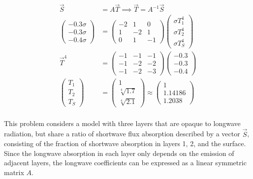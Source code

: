 \documentclass[12pt]{article}
\begin{document}
\begin{equation}\label{lw_inv}
    \begin{split}
        \vec{S}
            &= A\vec{T} \implies  \vec{T} = A^{-1} \vec{S} \\
        \begin{pmatrix}-0.3\sigma \\ -0.3\sigma \\ -0.4\sigma\end{pmatrix}
            &= \begin{pmatrix} -2 & 1 & 0 \\ 1 & -2 & 1 \\ 0 & 1 & -1 \end{pmatrix}
                \begin{pmatrix} \sigma T_1^4 \\ \sigma T_2^4 \\ \sigma T_S^4 \end{pmatrix} \\
        \vec{T}^4
            &= \begin{pmatrix} -1 & -1 & -1 \\ -1 & -2 & -2 \\ -1 & -2 & -3 \end{pmatrix} \begin{pmatrix}-0.3 \\ -0.3 \\ -0.4\end{pmatrix} \\
        \begin{pmatrix} T_1 \\ T_2 \\ T_S \end{pmatrix}
            &= \begin{pmatrix} 1 \\ \sqrt[4]{1.7} \\ \sqrt[4]{2.1} \end{pmatrix} \approx \begin{pmatrix} 1 \\ 1.14186 \\ 1.2038 \end{pmatrix} \\
    \end{split}
\end{equation}

This problem considers a model with three layers that are opaque to longwave radiation, but share a ratio of shortwave flux absorption described by a vector $\vec{S}$,
consisting of the fraction of shortwave absorption in layers 1, 2, and the surface. Since the longwave absorption in each layer only depends on
the emission of adjacent layers, the longwave coefficients can be expressed as a linear symmetric matrix $A$.
\end{document}
